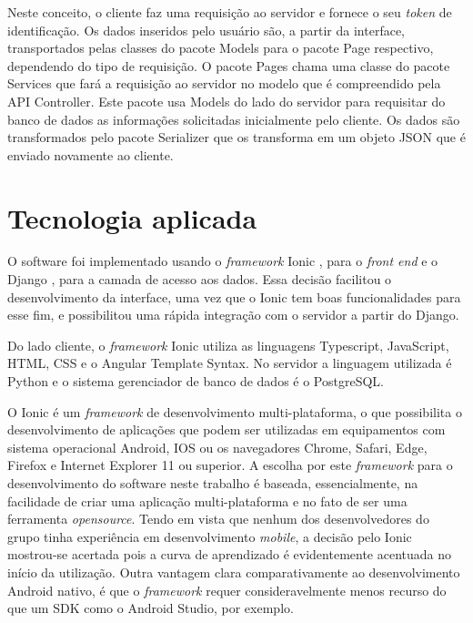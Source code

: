 Neste conceito, o cliente faz uma requisição ao servidor e fornece o seu \emph{token} de identificação. Os dados inseridos pelo usuário são, a partir da interface, transportados pelas classes do pacote Models para o pacote Page respectivo, dependendo do tipo de requisição. O pacote Pages chama uma classe do pacote Services que fará a requisição ao servidor no modelo que é compreendido pela API Controller. Este pacote usa Models do lado do servidor para requisitar do banco de dados as informações solicitadas inicialmente pelo cliente. Os dados são transformados pelo pacote Serializer que os transforma em um objeto JSON que é enviado novamente ao cliente.

\section{Tecnologia aplicada}

% 

O software foi implementado usando o \emph{framework} Ionic \citep{ionic}, para o \emph{front end} e o Django \citep{django}, para a camada de acesso aos dados. Essa decisão facilitou o desenvolvimento da interface, uma vez que o Ionic tem boas funcionalidades para esse fim, e possibilitou uma rápida integração com o servidor a partir do Django.

Do lado cliente, o \emph{framework} Ionic utiliza as linguagens Typescript, JavaScript, HTML, CSS e o Angular Template Syntax. No servidor a linguagem utilizada é Python e o sistema gerenciador de banco de dados é o PostgreSQL.

O Ionic é um \emph{framework} de desenvolvimento multi-plataforma, o que possibilita o desenvolvimento de aplicações que podem ser utilizadas em equipamentos com sistema operacional Android, IOS ou os navegadores Chrome, Safari, Edge, Firefox e Internet Explorer 11 ou superior. A escolha por este \emph{framework} para o desenvolvimento do software neste trabalho é baseada, essencialmente, na facilidade de criar uma aplicação multi-plataforma e no fato de ser uma ferramenta \emph{opensource}. Tendo em vista que nenhum dos desenvolvedores do grupo tinha experiência em desenvolvimento \emph{mobile}, a decisão pelo Ionic mostrou-se acertada pois a curva de aprendizado é evidentemente acentuada no início da utilização. Outra vantagem clara comparativamente ao desenvolvimento Android nativo, é que o \emph{framework} requer consideravelmente menos recurso do que um SDK como o Android Studio, por exemplo.

